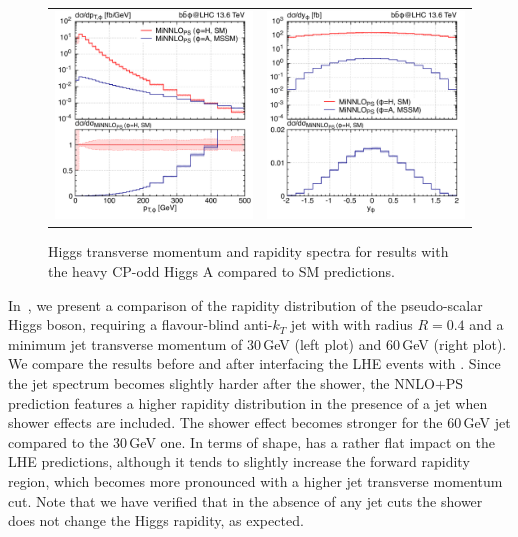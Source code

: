 \documentclass[11pt,a4paper]{article}
\begin{document}
\begin{figure}[t!]
\begin{center}
\begin{tabular}{cc}
\includegraphics[width=.45\textwidth, page=1]{plots/5fs/BSM/pt_Higgs.pdf}&
\includegraphics[width=.45\textwidth, page=1]{plots/5fs/BSM/y_Higgs.pdf}
\end{tabular}
\vspace*{1ex}
\caption{Higgs transverse momentum and rapidity spectra for \minnlo{} results with the heavy CP-odd Higgs $\text{A}$ compared to SM predictions.\label{fig:SMvsBSM}}
\end{center}
\end{figure}

In~, we present a comparison of the rapidity distribution of the pseudo-scalar Higgs boson, requiring a flavour-blind anti-$k_T$ jet with with radius $R = 0.4$ and 
a minimum jet transverse momentum of 30\,GeV (left plot) and 60\,GeV (right plot). We compare the results before and after interfacing the LHE events with . 
Since the jet spectrum becomes slightly harder after the shower, the NNLO+PS prediction features a higher rapidity distribution in the 
presence of a jet when shower effects are included. The shower effect becomes stronger for the 60\,GeV jet compared to the 30\,GeV one. 
In terms of shape,  has a rather flat impact on the LHE predictions, although it tends to slightly increase the forward rapidity region, which becomes 
more pronounced with a higher jet transverse momentum cut. Note that we have verified that in the absence of any jet cuts the shower does not change the 
Higgs rapidity, as expected.  
\end{document}
